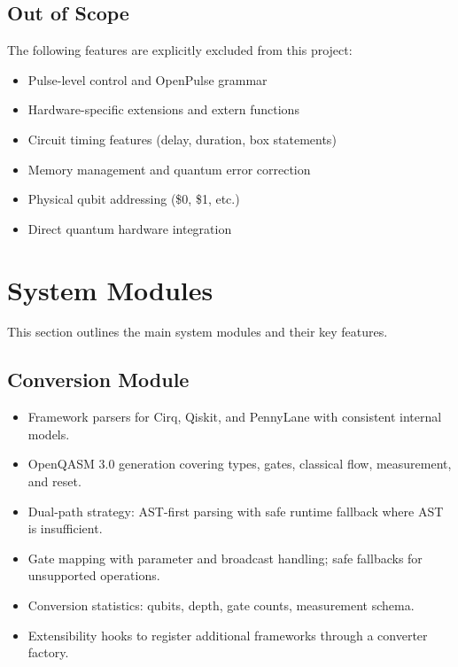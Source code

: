 \subsection{Out of Scope}

The following features are explicitly excluded from this project:
\begin{itemize}
    \item Pulse-level control and OpenPulse grammar
    \item Hardware-specific extensions and extern functions
    \item Circuit timing features (delay, duration, box statements)
    \item Memory management and quantum error correction
    \item Physical qubit addressing (\$0, \$1, etc.)
    \item Direct quantum hardware integration
\end{itemize}

\section{System Modules}

This section outlines the main system modules and their key features.

\subsection{Conversion Module}
\begin{itemize}
    \item Framework parsers for Cirq, Qiskit, and PennyLane with consistent internal models.
    \item OpenQASM 3.0 generation covering types, gates, classical flow, measurement, and reset.
    \item Dual-path strategy: AST-first parsing with safe runtime fallback where AST is insufficient.
    \item Gate mapping with parameter and broadcast handling; safe fallbacks for unsupported operations.
    \item Conversion statistics: qubits, depth, gate counts, measurement schema.
    \item Extensibility hooks to register additional frameworks through a converter factory.
\end{itemize}

